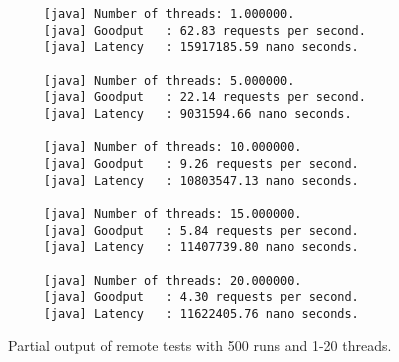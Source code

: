 \begin{figure}[h!]
\begin{verbatim}
     [java] Number of threads: 1.000000.
     [java] Goodput   : 62.83 requests per second.
     [java] Latency   : 15917185.59 nano seconds.

     [java] Number of threads: 5.000000.
     [java] Goodput   : 22.14 requests per second.
     [java] Latency   : 9031594.66 nano seconds.

     [java] Number of threads: 10.000000.
     [java] Goodput   : 9.26 requests per second.
     [java] Latency   : 10803547.13 nano seconds.

     [java] Number of threads: 15.000000.
     [java] Goodput   : 5.84 requests per second.
     [java] Latency   : 11407739.80 nano seconds.

     [java] Number of threads: 20.000000.
     [java] Goodput   : 4.30 requests per second.
     [java] Latency   : 11622405.76 nano seconds.
\end{verbatim}
\caption{Partial output of remote tests with 500 runs and 1-20 threads.}
\end{figure}

